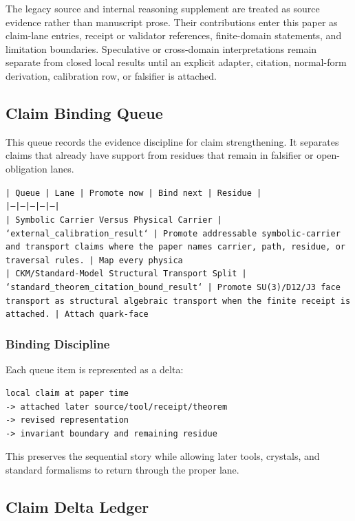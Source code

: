 \documentclass[11pt]{article}
\begin{document}
The legacy source and internal reasoning supplement are treated as source
evidence rather than manuscript prose. Their contributions enter this paper as
claim-lane entries, receipt or validator references, finite-domain statements,
and limitation boundaries. Speculative or cross-domain interpretations remain
separate from closed local results until an explicit adapter, citation,
normal-form derivation, calibration row, or falsifier is attached.
\subsection*{Claim Binding Queue}

This queue records the evidence discipline for claim strengthening. It separates claims that already have support from residues that remain in falsifier or open-obligation lanes.

\noindent\texttt{| Queue | Lane | Promote now | Bind next | Residue |}\\
\noindent\texttt{|---|---|---|---|---|}\\
\noindent\texttt{| Symbolic Carrier Versus Physical Carrier | `external\_calibration\_result` | Promote addressable symbolic-carrier and transport claims where the paper names carrier, path, residue, or traversal rules. | Map every physica}\\
\noindent\texttt{| CKM/Standard-Model Structural Transport Split | `standard\_theorem\_citation\_bound\_result` | Promote SU(3)/D12/J3 face transport as structural algebraic transport when the finite receipt is attached. | Attach quark-face }\\

\subsubsection*{Binding Discipline}

Each queue item is represented as a delta:

\begin{verbatim}
local claim at paper time
-> attached later source/tool/receipt/theorem
-> revised representation
-> invariant boundary and remaining residue
\end{verbatim}

This preserves the sequential story while allowing later tools, crystals, and
standard formalisms to return through the proper lane.

\subsection*{Claim Delta Ledger}
\end{document}
